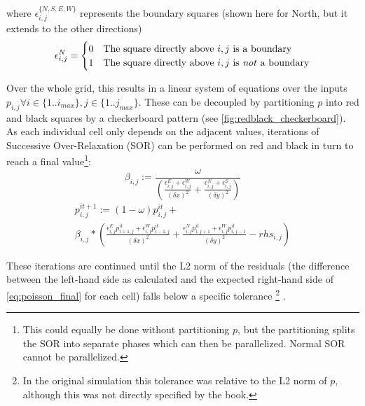where $\epsilon_{i,j}^{\{N,S,E,W\}}$ represents the boundary squares (shown here for North, but it extends to the other directions)
\begin{equation}
    \epsilon_{i,j}^{N} = \begin{cases}
        0 & \text{The square directly above $i,j$ is a boundary}\\
        1 & \text{The square directly above $i,j$ is \emph{not} a boundary}
   \end{cases}
\end{equation}



Over the whole grid, this results in a linear system of equations over the inputs $p_{i,j} \forall i \in \{1..i_{max}\}, j \in \{1..j_{max}\}$.
These can be decoupled by partitioning $p$ into red and black squares by a checkerboard pattern (see \cref{fig:redblack_checkerboard}).
As each individual cell only depends on the adjacent values, iterations of Successive Over-Relaxation (SOR) can be performed on red and black in turn to reach a final value\footnote{This could equally be done without partitioning $p$, but the partitioning splits the SOR into separate phases which can then be parallelized. Normal SOR cannot be parallelized\cite{Adams1982AMS}.}\cite{young1971iterative}:
\begin{equation}
    \beta_{i,j} := \frac{\omega}{\left(\frac{\epsilon_{i,j}^E+\epsilon_{i,j}^W}{(\delta{x})^2} + \frac{\epsilon_{i,j}^N+\epsilon_{i,j}^S}{(\delta{y})^2}\right)}
    \label{eq:poisson_beta}
\end{equation}
\begin{multline}
    p^{it+1}_{i,j} := (1 - \omega)p^{it}_{i,j} + \\
    \beta_{i,j} * \left(
    \frac{\epsilon_{i,j}^E p^{it}_{i+1,j}+\epsilon_{i,j}^W p^{it}_{i-1,j}}{(\delta{x})^2} + 
    \frac{\epsilon_{i,j}^N p^{it}_{i,j+1}+\epsilon_{i,j}^W p^{it}_{i,j-1}}{(\delta{y})^2} -
    rhs_{i,j}
    \right)
    \label{eq:poisson_final}
\end{multline}

These iterations are continued until the L2 norm\cite{l2norm} of the residuals (the difference between the left-hand side as calculated and the expected right-hand side of \cref{eq:poisson_final} for each cell) falls below a specific tolerance
\footnote{In the original simulation this tolerance was relative to the L2 norm of $p$, although this was not directly specified by the book.}
\cite{book:griebel1998numerical}.

